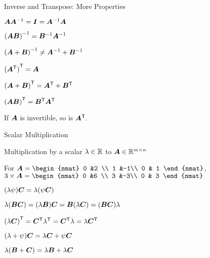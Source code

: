 \documentclass[handout,fleqn,aspectratio=169]{beamer}
\begin{document}
\begin{frame}{Inverse and Transpose: More Properties}

\plitemsep 0.2in
\bci 
\item $\bm{A}{\bm{A}}^{-1} = \bm{I} = {\bm{A}}^{-1}\bm{A}$

\item ${(\bm{AB})}^{-1} = {\bm{B}}^{-1} {\bm{A}}^{-1}$

\item ${(\bm{A} + \bm{B})}^{-1} \neq {\bm{A}}^{-1} + {\bm{B}}^{-1}$

\item ${({\bm{A}}^{\mathsf{T}})}^{\mathsf{T}} = \bm{A}$  

\item ${(\bm{A} + \bm{B})}^{\mathsf{T}} = {\bm{A}}^{\mathsf{T}} + {\bm{B}}^{\mathsf{T}}$

\item ${(\bm{A}\bm{B})}^{\mathsf{T}} = {\bm{B}}^{\mathsf{T}}{\bm{A}}^{\mathsf{T}}$

\item If $\bm{A}$ is invertible, so is ${\bm{A}}^{\mathsf{T}}.$
\eci

\end{frame}

\begin{frame}{Scalar Multiplication}

\plitemsep 0.1in
\bci 
    \item Multiplication by a scalar $\lambda \in {\mathbb R}$ to $\bm{A} \in {\mathbb R}^{m \times n}$
    \item \exam For 
$\mat{A} = 
\begin{nmat} 
 0 &2 \\
 1  &-1\\
 0  & 1
\end{nmat}
$,
$
3 \times \mA = \begin{nmat} 
 0 &6 \\
 3  &-3\\
 0  & 3
\end{nmat}
$

\bigskip

\item {}
\bci
\item $(\lambda \psi) \bm{C} = \lambda (\psi \bm{C})$
\item $\lambda(\bm{B} \bm{C}) = (\lambda \bm{B}) \bm{C} = \bm{B} (\lambda \bm{C}) = (\bm{B} \bm{C}) \lambda$
\item ${(\lambda \bm{C})}^{\mathsf{T}} = {\bm{C}}^{\mathsf{T}} {\lambda}^{\mathsf{T}} = {\bm{C}}^{\mathsf{T}} \lambda = \lambda {\bm{C}}^{\mathsf{T}}$
\eci

\item {}
\bci
\item $(\lambda + \psi) \bm{C} = \lambda \bm{C} + \psi \bm{C}$
\item $\lambda(\bm{B} + \bm{C}) = \lambda \bm{B} + \lambda \bm{C}$
\eci


\eci

\end{frame}
\end{document}
